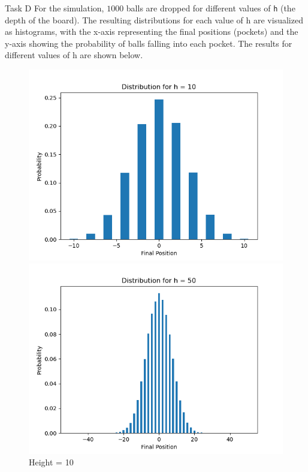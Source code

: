 \begin{task}{Task D}
	For the simulation, $1000$ balls are dropped for different values of
	\texttt{h} (the depth of the board). The resulting distributions for
	each value of h are visualized as histograms, with the x-axis
	representing the final positions (pockets) and the y-axis showing the
	probability of balls falling into each pocket. The results for
	different values of h are shown below.
	\begin{figure}[H]
		\centering
		\begin{minipage}{0.5\textwidth}
			\centering
			\includegraphics[width=\linewidth]{../images/2d1.png}
			\caption{Height = 10}
		\end{minipage}\hfill
		\begin{minipage}{0.5\textwidth}
			\centering
			\includegraphics[width=\linewidth]{../images/2d2.png}

\end{minipage}
\end{figure}
\end{task}

